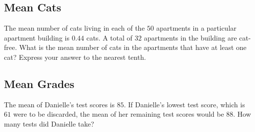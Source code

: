 \documentclass[12pt]{article}
\begin{document}
\newpage

\subsection*{Mean Cats}
The mean number of cats living in each of the $50$ apartments in a particular apartment building is $0.44$ cats. A total of $32$ apartments in the building are cat-free. What is the mean number of cats in the apartments that have at least one cat? Express your answer to the nearest tenth. 

\begin{answer}
%
\end{answer}

\newpage

\subsection*{Mean Grades}
The mean of Danielle's test scores is $85$. If Danielle's lowest test score, which is $61$ were to be discarded, the mean of her remaining test scores would be $88$. How many tests did Danielle take?
\end{document}
